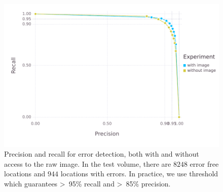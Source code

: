 \documentclass{article}
\begin{document}
\begin{figure}
\begin{center}
	\includegraphics[width=0.65\linewidth]{pr.pdf}
	\caption{Precision and recall for error detection, both with and without access to the raw image. In the test volume, there are $8248$ error free locations and $944$ locations with errors. In practice, we use threshold which guarantees >~95\% recall and >~85\% precision.}
	\label{fig:error_detection_pr}
\end{center}
\end{figure}
\end{document}
